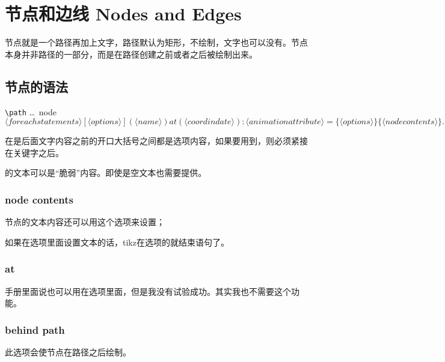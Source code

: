 \chapter{节点和边线 Nodes and Edges}
节点就是一个路径再加上文字，路径默认为矩形，不绘制，文字也可以没有。节点本身并非路径的一部分，而是在路径创建之前或者之后被绘制出来。

\section{节点的语法}
\verb|\path| \dots\ node
\begin{math}
	\langle foreach statements \rangle [\langle options\rangle] (\langle name\rangle) at (\langle coordindate\rangle) :
	\langle animation attribute\rangle=\{\langle options\rangle\} \{\langle node contents\rangle\} \dots;
\end{math}

在是后面文字内容之前的开口大括号之间都是选项内容，如果要用到，则必须紧接在关键字之后。

的文本可以是``脆弱''内容。即使是空文本也需要提供\texinline{{}}。

\subsection{node contents}
节点的文本内容还可以用这个选项来设置；
\begin{texlst}
\end{texlst}
如果在选项里面设置文本的话，tikz在选项的\texinline{]}就结束语句了。

\subsection{at}
手册里面说也可以用在选项里面，但是我没有试验成功。其实我也不需要这个功能。

\subsection{behind path}
此选项会使节点在路径之后绘制。
\begin{texlst}
\end{texlst}

